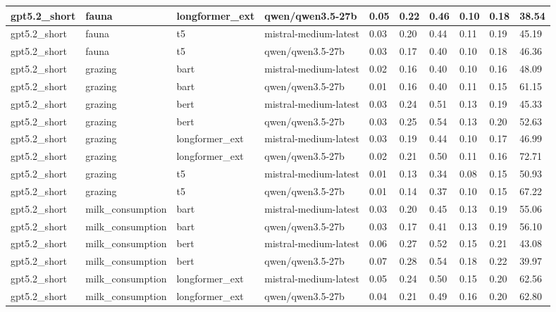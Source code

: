\begin{tabular}{|l|l|l|l|l|l|l|l|l|l|}
 \hline
 gpt5.2\_short & fauna & longformer\_ext & qwen/qwen3.5-27b & 0.05 & 0.22 & 0.46 & 0.10 & 0.18 & 38.54 \\
 \hline
 gpt5.2\_short & fauna & t5 & mistral-medium-latest & 0.03 & 0.20 & 0.44 & 0.11 & 0.19 & 45.19 \\
 \hline
 gpt5.2\_short & fauna & t5 & qwen/qwen3.5-27b & 0.03 & 0.17 & 0.40 & 0.10 & 0.18 & 46.36 \\
 \hline
 gpt5.2\_short & grazing & bart & mistral-medium-latest & 0.02 & 0.16 & 0.40 & 0.10 & 0.16 & 48.09 \\
 \hline
 gpt5.2\_short & grazing & bart & qwen/qwen3.5-27b & 0.01 & 0.16 & 0.40 & 0.11 & 0.15 & 61.15 \\
 \hline
 gpt5.2\_short & grazing & bert & mistral-medium-latest & 0.03 & 0.24 & 0.51 & 0.13 & 0.19 & 45.33 \\
 \hline
 gpt5.2\_short & grazing & bert & qwen/qwen3.5-27b & 0.03 & 0.25 & 0.54 & 0.13 & 0.20 & 52.63 \\
 \hline
 gpt5.2\_short & grazing & longformer\_ext & mistral-medium-latest & 0.03 & 0.19 & 0.44 & 0.10 & 0.17 & 46.99 \\
 \hline
 gpt5.2\_short & grazing & longformer\_ext & qwen/qwen3.5-27b & 0.02 & 0.21 & 0.50 & 0.11 & 0.16 & 72.71 \\
 \hline
 gpt5.2\_short & grazing & t5 & mistral-medium-latest & 0.01 & 0.13 & 0.34 & 0.08 & 0.15 & 50.93 \\
 \hline
 gpt5.2\_short & grazing & t5 & qwen/qwen3.5-27b & 0.01 & 0.14 & 0.37 & 0.10 & 0.15 & 67.22 \\
 \hline
 gpt5.2\_short & milk\_consumption & bart & mistral-medium-latest & 0.03 & 0.20 & 0.45 & 0.13 & 0.19 & 55.06 \\
 \hline
 gpt5.2\_short & milk\_consumption & bart & qwen/qwen3.5-27b & 0.03 & 0.17 & 0.41 & 0.13 & 0.19 & 56.10 \\
 \hline
 gpt5.2\_short & milk\_consumption & bert & mistral-medium-latest & 0.06 & 0.27 & 0.52 & 0.15 & 0.21 & 43.08 \\
 \hline
 gpt5.2\_short & milk\_consumption & bert & qwen/qwen3.5-27b & 0.07 & 0.28 & 0.54 & 0.18 & 0.22 & 39.97 \\
 \hline
 gpt5.2\_short & milk\_consumption & longformer\_ext & mistral-medium-latest & 0.05 & 0.24 & 0.50 & 0.15 & 0.20 & 62.56 \\
 \hline
 gpt5.2\_short & milk\_consumption & longformer\_ext & qwen/qwen3.5-27b & 0.04 & 0.21 & 0.49 & 0.16 & 0.20 & 62.80 \\

\end{tabular}
